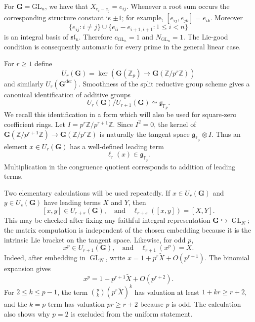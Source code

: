 \documentclass[11pt]{amsart}
\numberwithin{equation}{section}
\newcommand{\Z}{\mathbb Z}
\newcommand{\Fp}{\mathbb F_p}
\newcommand{\Zp}{\mathbb Z_p}
\newcommand{\frakg}{\mathfrak g}
\newcommand{\GG}{\mathbf G}
\newcommand{\Gder}{\mathbf G^{\mathrm{der}}}
\newcommand{\GL}{\operatorname{GL}}
\theoremstyle{definition}
\begin{document}
\par For $\GG=\mathrm{GL}_n$, we have that $X_{e_i-e_j}=e_{ij}$. Whenever a root sum occurs the corresponding structure constant is
$\pm1$; for example, $[e_{ij},e_{jk}]=e_{ik}$. Moreover
\[
        \{e_{ij}:i\neq j\}
        \cup
        \{e_{ii}-e_{i+1,i+1}:1\leq i<n\}
\]
is an integral basis of $\mathfrak{sl}_n$. Therefore $c_{\GL_n}=1$ and $N_{\GL_n}=1$. The Lie-good condition is consequently automatic for every prime in
the general linear case. 

For $r\ge1$ define
\[
 U_r(\GG)=\ker\!\left(\GG(\Zp)\to\GG(\Z/p^r\Z)\right)
\]
and similarly $U_r(\Gder)$.  Smoothness of the split reductive group
scheme gives a canonical identification of additive groups
\begin{equation}\label{eq:congruence-quotient}
 U_r(\GG)/U_{r+1}(\GG)
 \simeq\frakg_{\Fp}.
\end{equation}
We recall this identification in a form which will also be used for
square-zero coefficient rings.  Let $I=p^r\Z/p^{r+1}\Z$.  Since
$I^2=0$, the kernel of
$\GG(\Z/p^{r+1}\Z)\to\GG(\Z/p^r\Z)$ is naturally the tangent space
$\frakg_{\Fp}\otimes I$.  Thus an element $x\in U_r(\GG)$ has a
well-defined leading term
\[
        \ell_r(x)\in\frakg_{\Fp}.
\]
Multiplication in the congruence quotient corresponds to addition of
leading terms.

Two elementary calculations will be used repeatedly.  If
$x\in U_r(\GG)$ and $y\in U_s(\GG)$ have leading terms $X$ and $Y$,
then
\begin{equation}\label{eq:commutator-leading-general}
        [x,y]\in U_{r+s}(\GG),
        \quad\text{and}\quad
        \ell_{r+s}([x,y])=[X,Y].
\end{equation}
This may be checked after fixing any faithful integral representation
$\GG\hookrightarrow\GL_N$; the matrix computation is independent of
the chosen embedding because it is the intrinsic Lie bracket on the
tangent space.  Likewise, for odd $p$,
\begin{equation}\label{eq:p-power-leading-general}
        x^p\in U_{r+1}(\GG),
        \quad\text{and}\quad
        \ell_{r+1}(x^p)=X.
\end{equation}
Indeed, after embedding in $\GL_N$, write
$x=1+p^r\widetilde X+O(p^{r+1})$.  The binomial expansion gives
\[x^p=1+p^{r+1}\widetilde X+O(p^{r+2}).\] For
$2\le k\le p-1$, the term
$\binom pk(p^r\widetilde X)^k$ has valuation at least
$1+kr\ge r+2$, and the $k=p$ term has valuation
$pr\ge r+2$ because $p$ is odd.  The calculation also shows why $p=2$
is excluded from the uniform statement.
\end{document}
